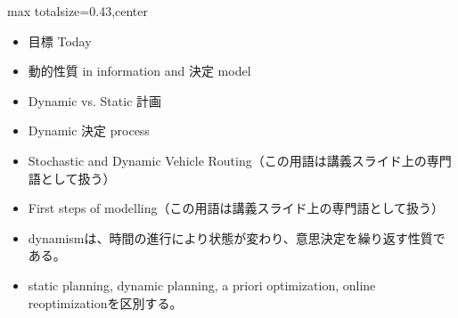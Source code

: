 \clearpage
{}
\begin{minipage}[t]{0.405\textwidth}
\begin{adjustbox}{max totalsize={\textwidth}{0.43\textheight},center}
\begin{minipage}{\textwidth}\scriptsize
{}\begin{itemize}
\item 目標 Today
\item 動的性質 in information and 決定 model
\item Dynamic vs. Static 計画
\item Dynamic 決定 process
\item Stochastic and Dynamic Vehicle Routing（この用語は講義スライド上の専門語として扱う）
\item First steps of modelling（この用語は講義スライド上の専門語として扱う）
\end{itemize}\begin{itemize}
\item dynamismは、時間の進行により状態が変わり、意思決定を繰り返す性質である。
\item static planning, dynamic planning, a priori optimization, online reoptimizationを区別する。
\end{itemize}
\end{minipage}
\end{adjustbox}
\end{minipage}\hfill
